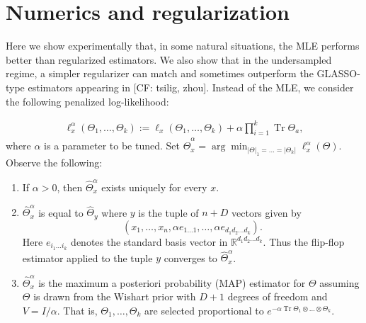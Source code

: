\documentclass[aos]{imsart}
\theoremstyle{definition}
\DeclareMathOperator{\tr}{Tr}
\newcommand{\R}{{\mathbb{R}}}
\newcommand{\ot}{\otimes}
\newcommand{\E}{\mathbb{E}}
\newcommand{\samp}{x}
\newcommand{\CF}[1]{{\color{purple}[CF: #1]}}
\begin{document}




\section{Numerics and regularization}\label{sec:numerics}
Here we show experimentally that, in some natural situations, the MLE performs better than regularized estimators. We also show that in the undersampled regime, a simpler regularizer can match and sometimes outperform the GLASSO-type estimators appearing in \CF{tsilig, zhou}. Instead of the MLE, we consider the following penalized log-likelihood:

\begin{align*}
  \ell_{\samp}^\alpha(\Theta_1, \dots, \Theta_k)
  := \ell_{\samp}(\Theta_1, \dots, \Theta_k) + \alpha \prod_{i=1}^k \tr \Theta_a,
\end{align*}
where $\alpha$ is a parameter to be tuned. Set $\widehat{\Theta}^\alpha_x = \arg\min_{|\Theta|_1 =\dots =  |\Theta_k|} \ell^\alpha_\samp(\Theta)$.
Observe the following:
\begin{enumerate}
\item If $\alpha > 0$, then $\widehat{\Theta}^\alpha_x$ exists uniquely for every $x$.
\item $\widehat{\Theta}^\alpha_x$ is equal to $\widehat{\Theta}_{y}$ where $y$ is the tuple of $n + D$ vectors given by
$$(x_1, \dots, x_n, \alpha e_{1\dots 1}, \dots, \alpha e_{d_1d_2 \dots d_k}).$$ Here $e_{i_1 \dots i_k}$ denotes the standard basis vector in $\R^{d_1d_2 \dots d_k}$. Thus the flip-flop estimator applied to the tuple $y$ converges to $\widehat{\Theta}^\alpha_x$.

\item $\widehat{\Theta}^\alpha_x$ is the maximum a posteriori probability (MAP) estimator for $\Theta$ assuming $\Theta$ is drawn from the Wishart prior with $D + 1$ degrees of freedom and $V = I/\alpha$. That is, $\Theta_1, \dots, \Theta_k$ are selected proportional to $e^{- \alpha \tr \Theta_1 \ot \dots \ot \Theta_k}.$ 
\end{enumerate}
\end{document}
